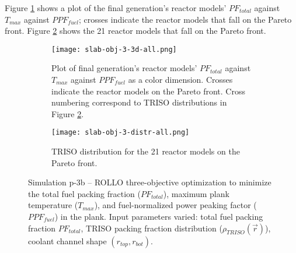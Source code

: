 Figure \ref{fig:slab-obj-3-3d-all} shows a plot of the final generation's reactor 
models' $PF_{total}$ against $T_{max}$ against $PPF_{fuel}$; 
crosses indicate the reactor models that fall on the Pareto front.
Figure \ref{fig:slab-obj-3-distr-all} shows the 21 reactor models that fall on the
Pareto front. 
\begin{figure}[htbp!]
    \begin{subfigure}{\textwidth}
        \centering
        \texttt{[image: slab-obj-3-3d-all.png]}
        \caption{Plot of final generation's reactor models' $PF_{total}$ against 
        $T_{max}$ against $PPF_{fuel}$ as a color dimension. 
        Crosses indicate the reactor models on the 
        Pareto front. Cross numbering correspond to TRISO distributions in Figure 
        \ref{fig:slab-obj-3-distr-all}.}
        \label{fig:slab-obj-3-3d-all} 
    \end{subfigure}
    \begin{subfigure}{\textwidth}
        \texttt{[image: slab-obj-3-distr-all.png]}
        \caption{TRISO distribution for the 21 reactor models on the Pareto front.}
        \label{fig:slab-obj-3-distr-all} 
    \end{subfigure}
    \caption{Simulation p-3b -- ROLLO three-objective optimization to minimize the total 
    fuel packing fraction ($PF_{total}$), maximum plank temperature ($T_{max}$), and 
    fuel-normalized power peaking factor ($PPF_{fuel}$) in the plank. 
    Input parameters varied: total fuel packing fraction $PF_{total}$, 
    TRISO packing fraction distribution ($\rho_{TRISO}(\vec{r})$), 
    coolant channel shape $(r_{top}, r_{bot})$.}
    \label{fig:slab-obj-3-all}
\end{figure}

